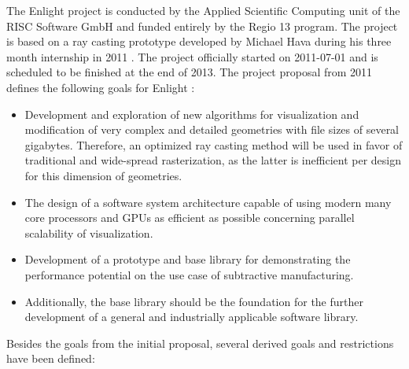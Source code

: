 The Enlight project is conducted by the Applied Scientific Computing unit of the RISC Software GmbH and funded entirely by the Regio 13 program. The project is based on a ray casting prototype developed by Michael Hava during his three month internship in 2011  \cite{bakk_michael_hava}. The project officially started on 2011-07-01 and is scheduled to be finished at the end of 2013.
The project proposal from 2011 defines the following goals for Enlight \cite{enlight_proposal} :

\begin{itemize}
	\item Development and exploration of new algorithms for visualization and modification of very complex and detailed geometries with file sizes of several gigabytes. Therefore, an optimized ray casting method will be used in favor of traditional and wide-spread rasterization, as the latter is inefficient per design for this dimension of geometries.

	\item The design of a software system architecture capable of using modern many core processors and GPUs as efficient as possible concerning parallel scalability of visualization.
	
	\item Development of a prototype and base library for demonstrating the performance potential on the use case of subtractive manufacturing.
	
	\item Additionally, the base library should be the foundation for the further development of a general and industrially applicable software library.
\end{itemize}

Besides the goals from the initial proposal, several derived goals and restrictions have been defined:


